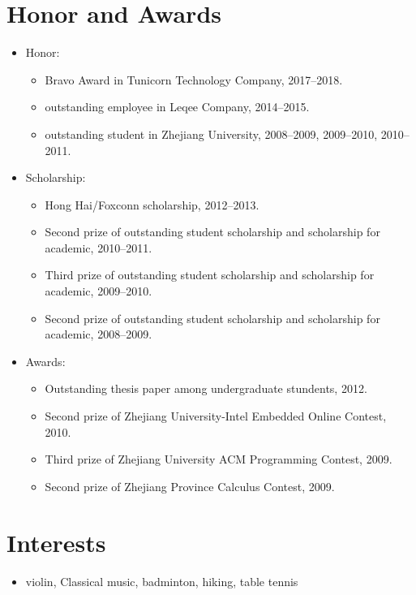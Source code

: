 \documentclass[letterpaper]{article}
\begin{document}
\section*{Honor and Awards}
\begin{itemize}
    \item Honor:
        \begin{itemize}
            \item Bravo Award in Tunicorn Technology Company, 2017--2018.
            \item outstanding employee in Leqee Company, 2014--2015.
            \item outstanding student in Zhejiang University, 2008--2009, 2009--2010, 2010--2011.
        \end{itemize}
    \item Scholarship:
        \begin{itemize}
            \item Hong Hai/Foxconn scholarship, 2012--2013.	
            \item Second prize of outstanding student scholarship and scholarship for academic, 2010--2011.
            \item Third prize of outstanding student scholarship and scholarship for academic, 2009--2010.
            \item Second prize of outstanding student scholarship and scholarship for academic, 2008--2009.
        \end{itemize}
    \item Awards:
        \begin{itemize}
            \item Outstanding thesis paper among undergraduate stundents, 2012.
            \item Second prize of Zhejiang University-Intel Embedded Online Contest, 2010.
            \item Third prize of Zhejiang University ACM Programming Contest, 2009.
            \item Second prize of Zhejiang Province Calculus Contest, 2009.
        \end{itemize}
\end{itemize}


\section*{Interests}
\begin{itemize}
\item violin, Classical music, badminton, hiking, table tennis
\end{itemize}

\bigskip
\begin{center}
    \begin{footnotesize}
    \end{footnotesize}
\end{center}
\end{document}
